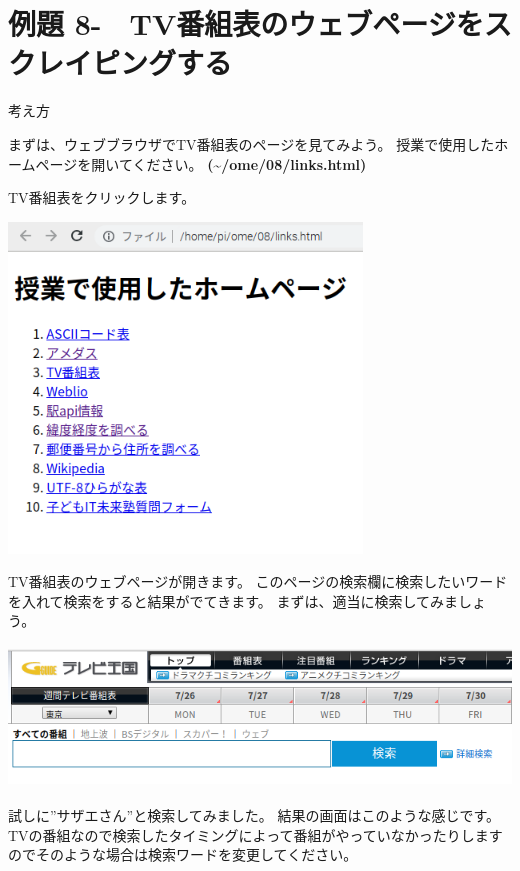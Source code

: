 \documentclass[a4paper,12pt,dvipdfmx]{jarticle}
\newcounter{Exercise}
\renewcommand\theExercise{例題 8-\arabic{Exercise}}
\begin{document}
\bigskip


\bigskip

\clearpage\section*{\theExercise　TV番組表のウェブページをスクレイピングする}
\addtocounter{Exercise}{-1}\label{E:TV}
考え方

まずは、ウェブブラウザでTV番組表のページを見てみよう。
授業で使用したホームページを開いてください。
\textbf{(\~{}/ome/08/links.html)}

TV番組表をクリックします。 



\begin{center}
\includegraphics[width=9.398cm,height=8.784cm]{textbook-img017.png}

\end{center}


\bigskip


\bigskip

TV番組表のウェブページが開きます。
このページの検索欄に検索したいワードを入れて検索をすると結果がでてきます。
まずは、適当に検索してみましょう。



\begin{center}
\includegraphics[width=14.099cm,height=3.768cm]{textbook-img041.png}

\end{center}
\clearpage
試しに”サザエさん”と検索してみました。
結果の画面はこのような感じです。
TVの番組なので検索したタイミングによって番組がやっていなかったりしますのでそのような場合は検索ワードを変更してください。
\end{document}
